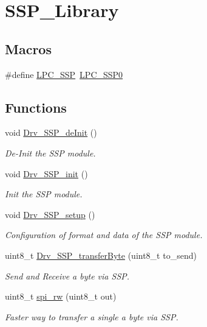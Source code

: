 \hypertarget{group__SSP__Library}{}\section{S\+S\+P\+\_\+\+Library}
\label{group__SSP__Library}
\subsection*{Macros}
\begin{DoxyCompactItemize}
\item 
\#define \hyperlink{group__SSP__Library_ga3e1177fbcbb4d87f0a2391e59042a5fc}{L\+P\+C\+\_\+\+S\+SP}~\hyperlink{group__PERIPH__407X__8X__BASE_gac213e0325a8e8a972bd2e0dd6ccf353c}{L\+P\+C\+\_\+\+S\+S\+P0}
\end{DoxyCompactItemize}
\subsection*{Functions}
\begin{DoxyCompactItemize}
\item 
void \hyperlink{group__SSP__Library_ga564dfbd00e01e9e2f7e5cb1537b46db6}{Drv\+\_\+\+S\+S\+P\+\_\+de\+Init} ()
\begin{DoxyCompactList}\small\item\em De-\/\+Init the S\+SP module. \end{DoxyCompactList}\item 
void \hyperlink{group__SSP__Library_ga0c5eb23f106efe0d4b8687874954c549}{Drv\+\_\+\+S\+S\+P\+\_\+init} ()
\begin{DoxyCompactList}\small\item\em Init the S\+SP module. \end{DoxyCompactList}\item 
void \hyperlink{group__SSP__Library_ga0f01059c0a84ecf456f3ad9d38b9794b}{Drv\+\_\+\+S\+S\+P\+\_\+setup} ()
\begin{DoxyCompactList}\small\item\em Configuration of format and data of the S\+SP module. \end{DoxyCompactList}\item 
uint8\+\_\+t \hyperlink{group__SSP__Library_ga785ce7239c2c42f4a871322b9cff56b7}{Drv\+\_\+\+S\+S\+P\+\_\+transfer\+Byte} (uint8\+\_\+t to\+\_\+send)
\begin{DoxyCompactList}\small\item\em Send and Receive a byte via S\+SP. \end{DoxyCompactList}\item 
uint8\+\_\+t \hyperlink{group__SSP__Library_ga3808c285915bc0c410f4188eafce502d}{spi\+\_\+rw} (uint8\+\_\+t out)
\begin{DoxyCompactList}\small\item\em Faster way to transfer a single a byte via S\+SP. \end{DoxyCompactList}\end{DoxyCompactItemize}


